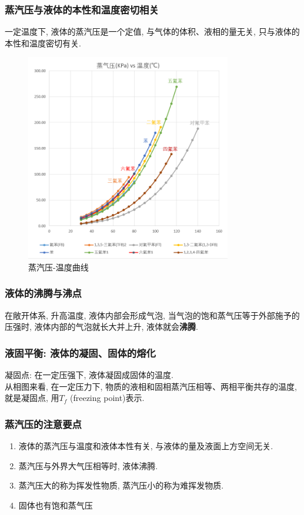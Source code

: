 \documentclass[12pt, a4paper, oneside]{ctexbook}
\begin{document}
\subsubsection*{蒸汽压与液体的本性和温度密切相关}
一定温度下, 液体的蒸汽压是一个定值, 与气体的体积、液相的量无关, 只与液体的本性和温度密切有关. 
\begin{figure}[htbp]
    \centering
    \includegraphics[width=0.8\textwidth]{pics/vapor_pressure.png}
    \caption{蒸汽压-温度曲线}
\end{figure}

\newpage
\subsubsection{液体的沸腾与沸点}
在敞开体系, 升高温度, 液体内部会形成气泡, 当气泡的饱和蒸气压等于外部施予的压强时, 液体内部的气泡就长大并上升, 液体就会\textbf{沸腾}.
\subsubsection{液固平衡: 液体的凝固、固体的熔化}
凝固点: 在一定压强下, 液体凝固成固体的温度. \\
从相图来看, 在一定压力下, 物质的液相和固相蒸汽压相等、两相平衡共存的温度, 就是凝固点, 用$T_f$ (freezing point)表示. 

\subsubsection{蒸汽压的注意要点}
\begin{enumerate}
    \item 液体的蒸汽压与温度和液体本性有关, 与液体的量及液面上方空间无关. 
    \item 蒸汽压与外界大气压相等时, 液体沸腾. 
    \item 蒸汽压大的称为挥发性物质, 蒸汽压小的称为难挥发物质. 
    \item 固体也有饱和蒸气压
\end{enumerate}
\end{document}
